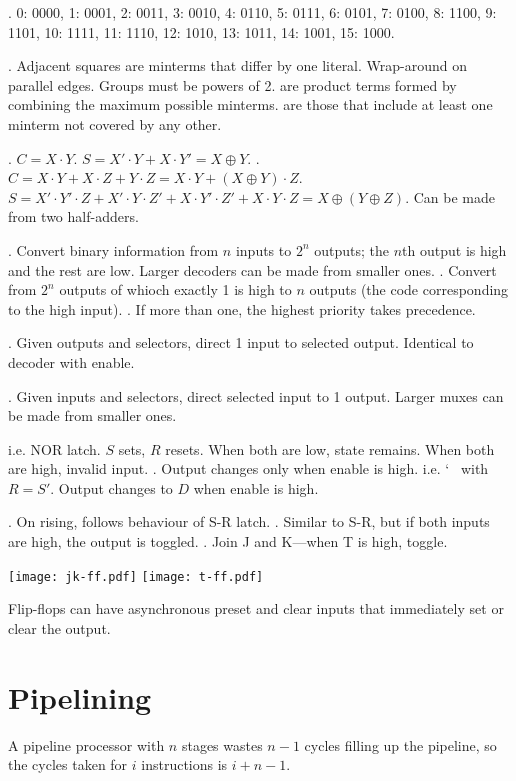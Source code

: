 \documentclass{slnotes}
\begin{document}
. 0: 0000, 1: 0001, 2: 0011, 3: 0010, 4: 0110, 5: 0111, 6: 0101, 7: 0100, 8: 1100, 9: 1101, 10: 1111, 11: 1110, 12: 1010, 13: 1011, 14: 1001, 15: 1000.

. Adjacent squares are minterms that differ by one literal. Wrap-around on parallel edges. Groups must be powers of 2.  are product terms formed by combining the maximum possible minterms.  are those that include at least one minterm not covered by any other.

. \(C = X \cdot Y\). \(S = X' \cdot Y + X \cdot Y' = X \oplus Y\). . \(C = X \cdot Y + X \cdot Z + Y \cdot Z = X \cdot Y + (X \oplus Y) \cdot Z\). \(S = X' \cdot Y' \cdot Z + X' \cdot Y \cdot Z' + X \cdot Y' \cdot Z' + X \cdot Y \cdot Z = X \oplus (Y \oplus Z)\). Can be made from two half-adders.

. Convert binary information from \(n\) inputs to \(2^n\) outputs; the \(n\)th output is high and the rest are low. Larger decoders can be made from smaller ones. . Convert from \(2^n\) outputs of whioch exactly 1 is high to \(n\) outputs (the code corresponding to the high input). . If more than one, the highest priority takes precedence.

. Given outputs and selectors, direct 1 input to selected output. Identical to decoder with enable.

. Given inputs and selectors, direct selected input to 1 output. Larger muxes can be made from smaller ones.

 i.e. NOR latch. \(S\) sets, \(R\) resets. When both are low, state remains. When both are high, invalid input. . Output changes only when enable is high.  i.e. \char`~ with \(R = S'\). Output changes to \(D\) when enable is high.

. On rising, follows behaviour of S-R latch. . Similar to S-R, but if both inputs are high, the output is toggled. . Join J and K---when T is high, toggle.

\texttt{[image: jk-ff.pdf]}
\texttt{[image: t-ff.pdf]}

Flip-flops can have asynchronous preset and clear inputs that immediately set or clear the output.

\chapter{Pipelining}
A pipeline processor with \(n\) stages wastes \(n - 1\) cycles filling up the pipeline, so the cycles taken for \(i\) instructions is \(i + n - 1\).
\end{document}

